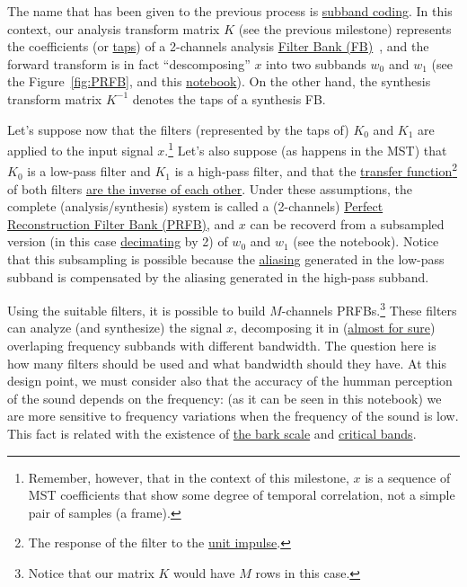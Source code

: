 The name that has been given to the previous process is
\href{https://en.wikipedia.org/wiki/Sub-band_coding}{subband
  coding}. In this context, our analysis transform matrix $K$ (see the
previous milestone) represents the coefficients (or
\href{https://en.wikipedia.org/wiki/Finite_impulse_response}{taps}) of
a 2-channels analysis
\href{https://en.wikipedia.org/wiki/Filter_bank}{Filter Bank
  (FB)}~\cite{vetterli1995wavelets}, and the forward transform is in
fact ``descomposing'' $x$ into two subbands $w_0$ and $w_1$ (see the
Figure~\ref{fig:PRFB}, and this \href{}{notebook}). On the other hand,
the synthesis transform matrix $K^{-1}$ denotes the taps of a
synthesis FB.

Let's suppose now that the filters (represented by the taps of) $K_0$
and $K_1$ are applied to the input signal $x$.\footnote{Remember,
  however, that in the context of this milestone, $x$ is a sequence of
  MST coefficients that show some degree of temporal correlation, not
  a simple pair of samples (a frame).} Let's also suppose (as happens
in the MST) that $K_0$ is a low-pass filter and $K_1$ is a high-pass
filter, and that the
\href{https://en.wikipedia.org/wiki/Filter_(signal_processing)#The_transfer_function}{transfer
  function}\footnote{The response of the filter to the
  \href{https://en.wikipedia.org/?title=Unit_impulse&redirect=no}{unit
    impulse}.} of both filters
\href{https://en.wikipedia.org/wiki/Filter_bank#Perfect_reconstruction_filter_banks}{are
  the inverse of each other}. Under these assumptions, the complete
(analysis/synthesis) system is called a (2-channels)
\href{https://en.wikipedia.org/wiki/Filter_bank#Perfect_reconstruction_filter_banks}{Perfect
  Reconstruction Filter Bank (PRFB)}, and $x$ can be recoverd from a
subsampled version (in this case
\href{https://en.wikipedia.org/wiki/Downsampling_(signal_processing)}{decimating}
by 2) of $w_0$ and $w_1$ (see the notebook). Notice that this
subsampling is possible because the
\href{https://en.wikipedia.org/wiki/Aliasing}{aliasing} generated in
the low-pass subband is compensated by the aliasing generated in the
high-pass subband.

Using the suitable filters, it is possible to build $M$-channels
PRFBs.\footnote{Notice that our matrix $K$ would have $M$ rows in this
  case.} These filters can analyze (and synthesize) the signal $x$,
decomposing it in
(\href{https://en.wikipedia.org/wiki/Low-pass_filter#Ideal_and_real_filters}{almost
  for sure}) overlaping frequency subbands with different
bandwidth. The question here is how many filters should be used and
what bandwidth should they have. At this design point, we must
consider also that the accuracy of the humman perception of the sound
depends on the frequency: (as it can be seen in this notebook) we are
more sensitive to frequency variations when the frequency of the sound
is low. This fact is related with the existence of
\href{https://en.wikipedia.org/wiki/Bark_scale}{the bark scale} and
\href{https://en.wikipedia.org/wiki/Critical_band}{critical bands}.

